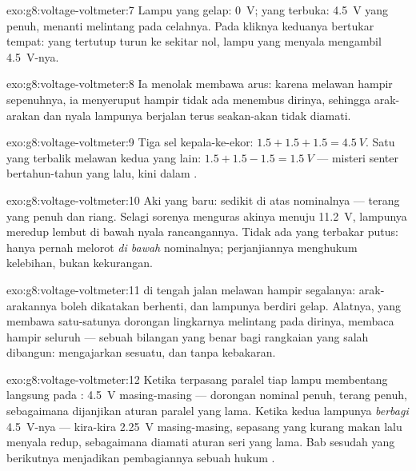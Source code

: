\begin{solution}{exo:g8:voltage-voltmeter:7}
Lampu yang gelap: \qty{0}{V};  yang terbuka: \qty{4.5}{V} yang
penuh, menanti melintang pada celahnya. Pada  kliknya keduanya
bertukar tempat:  yang tertutup turun ke sekitar nol, lampu
yang menyala mengambil \qty{4.5}{V}-nya.
\end{solution}

\begin{solution}{exo:g8:voltage-voltmeter:8}
Ia menolak membawa arus: karena melawan hampir sepenuhnya, ia
menyeruput hampir tidak ada menembus dirinya, sehingga arak-arakan dan
nyala lampunya berjalan terus seakan-akan tidak diamati.
\end{solution}

\begin{solution}{exo:g8:voltage-voltmeter:9}
Tiga sel kepala-ke-ekor: $1.5 + 1.5 + 1.5 = \qty{4.5}{V}$. Satu yang
terbalik melawan kedua yang lain: $1.5 + 1.5 - 1.5 = \qty{1.5}{V}$
--- misteri senter bertahun-tahun yang lalu, kini dalam .
\end{solution}

\begin{solution}{exo:g8:voltage-voltmeter:10}
Aki yang baru: sedikit di atas nominalnya --- terang yang penuh dan
riang. Selagi sorenya menguras akinya menuju \qty{11.2}{V}, lampunya
meredup lembut di bawah nyala rancangannya. Tidak ada yang terbakar
putus:  hanya pernah melorot \emph{di bawah} nominalnya;
perjanjiannya menghukum kelebihan, bukan kekurangan.
\end{solution}

\begin{solution}{exo:g8:voltage-voltmeter:11}
 di tengah jalan melawan hampir segalanya: arak-arakannya
boleh dikatakan berhenti, dan lampunya berdiri gelap. Alatnya, yang
membawa satu-satunya dorongan lingkarnya melintang pada dirinya,
membaca hampir seluruh   --- sebuah bilangan yang
benar bagi rangkaian yang salah dibangun: mengajarkan sesuatu, dan
tanpa kebakaran.
\end{solution}

\begin{solution}{exo:g8:voltage-voltmeter:12}
Ketika terpasang paralel tiap lampu membentang langsung pada
: \qty{4.5}{V} masing-masing --- dorongan nominal penuh,
terang penuh, sebagaimana dijanjikan aturan paralel yang lama. Ketika
 kedua lampunya \emph{berbagi} \qty{4.5}{V}-nya ---
kira-kira \qty{2.25}{V} masing-masing, sepasang yang kurang makan lalu
menyala redup, sebagaimana diamati aturan seri yang lama. Bab sesudah
yang berikutnya menjadikan pembagiannya sebuah hukum .
\end{solution}

